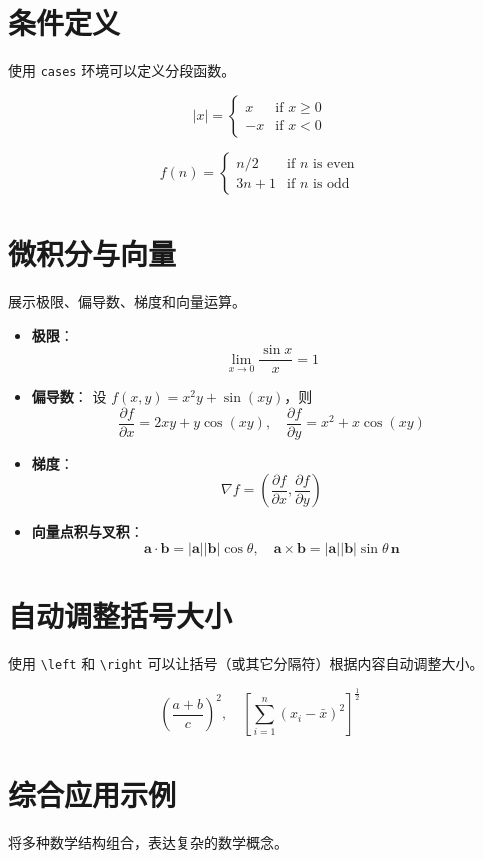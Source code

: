 \documentclass{article}
\begin{document}
\section{条件定义}
使用 \texttt{cases} 环境可以定义分段函数。

\[
|x| = \begin{cases} 
x & \text{if } x \geq 0 \\
-x & \text{if } x < 0 
\end{cases}
\]

\[
f(n) = \begin{cases} 
n/2 & \text{if } n \text{ is even} \\
3n+1 & \text{if } n \text{ is odd} 
\end{cases}
\]

\section{微积分与向量}
展示极限、偏导数、梯度和向量运算。

\begin{itemize}
    \item \textbf{极限}：
    \[
    \lim_{x \to 0} \frac{\sin x}{x} = 1
    \]
    \item \textbf{偏导数}：
    设 $f(x,y) = x^2y + \sin(xy)$，则
    \[
    \frac{\partial f}{\partial x} = 2xy + y\cos(xy), \quad
    \frac{\partial f}{\partial y} = x^2 + x\cos(xy)
    \]
    \item \textbf{梯度}：
    \[
    \nabla f = \left( \frac{\partial f}{\partial x}, \frac{\partial f}{\partial y} \right)
    \]
    \item \textbf{向量点积与叉积}：
    \[
    \mathbf{a} \cdot \mathbf{b} = |\mathbf{a}| |\mathbf{b}| \cos \theta, \quad
    \mathbf{a} \times \mathbf{b} = |\mathbf{a}| |\mathbf{b}| \sin \theta \, \mathbf{n}
    \]
\end{itemize}

\section{自动调整括号大小}
使用 \texttt{\textbackslash left} 和 \texttt{\textbackslash right} 可以让括号（或其它分隔符）根据内容自动调整大小。

\[
\left( \frac{a+b}{c} \right)^2, \quad
\left[ \sum_{i=1}^{n} \left( x_i - \bar{x} \right)^2 \right]^{\frac{1}{2}}
\]

\section{综合应用示例}
将多种数学结构组合，表达复杂的数学概念。
\end{document}
